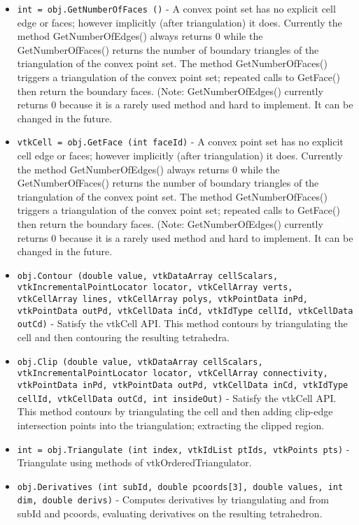 \begin{itemize}
\item  \verb|int = obj.GetNumberOfFaces ()| -  A convex point set has no explicit cell edge or faces; however
 implicitly (after triangulation) it does. Currently the method
 GetNumberOfEdges() always returns 0 while the GetNumberOfFaces() returns
 the number of boundary triangles of the triangulation of the convex
 point set. The method GetNumberOfFaces() triggers a triangulation of the
 convex point set; repeated calls to GetFace() then return the boundary
 faces. (Note: GetNumberOfEdges() currently returns 0 because it is a
 rarely used method and hard to implement. It can be changed in the future.

\item  \verb|vtkCell = obj.GetFace (int faceId)| -  A convex point set has no explicit cell edge or faces; however
 implicitly (after triangulation) it does. Currently the method
 GetNumberOfEdges() always returns 0 while the GetNumberOfFaces() returns
 the number of boundary triangles of the triangulation of the convex
 point set. The method GetNumberOfFaces() triggers a triangulation of the
 convex point set; repeated calls to GetFace() then return the boundary
 faces. (Note: GetNumberOfEdges() currently returns 0 because it is a
 rarely used method and hard to implement. It can be changed in the future.

\item  \verb|obj.Contour (double value, vtkDataArray cellScalars, vtkIncrementalPointLocator locator, vtkCellArray verts, vtkCellArray lines, vtkCellArray polys, vtkPointData inPd, vtkPointData outPd, vtkCellData inCd, vtkIdType cellId, vtkCellData outCd)| -  Satisfy the vtkCell API. This method contours by triangulating the
 cell and then contouring the resulting tetrahedra.

\item  \verb|obj.Clip (double value, vtkDataArray cellScalars, vtkIncrementalPointLocator locator, vtkCellArray connectivity, vtkPointData inPd, vtkPointData outPd, vtkCellData inCd, vtkIdType cellId, vtkCellData outCd, int insideOut)| -  Satisfy the vtkCell API. This method contours by triangulating the
 cell and then adding clip-edge intersection points into the
 triangulation; extracting the clipped region.

\item  \verb|int = obj.Triangulate (int index, vtkIdList ptIds, vtkPoints pts)| -  Triangulate using methods of vtkOrderedTriangulator.

\item  \verb|obj.Derivatives (int subId, double pcoords[3], double values, int dim, double derivs)| -  Computes derivatives by triangulating and from subId and pcoords,
 evaluating derivatives on the resulting tetrahedron.


\end{itemize}
